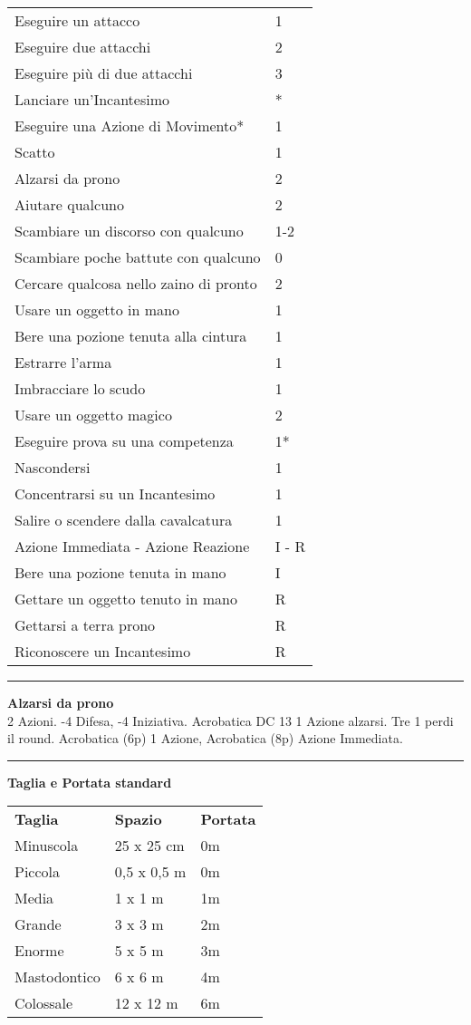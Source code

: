 \documentclass[a4paper,12 pt,openany]{book}
\newcommand{\riga}{\rule{\textwidth}{0.4pt}}
\begin{document}
\begin{textblock*}{8.3cm}
\begin{tabular}{ll}
Eseguire un attacco  					& 1\\
Eseguire due attacchi					& 2\\
Eseguire più di due attacchi			& 3\\
Lanciare un'Incantesimo					& *\\
Eseguire una Azione di Movimento*		& 1\\
Scatto               					& 1\\
Alzarsi da prono						& 2\\
Aiutare qualcuno						& 2\\
Scambiare un discorso con qualcuno		& 1-2\\
Scambiare poche battute con qualcuno	& 0\\
Cercare qualcosa nello zaino di pronto	& 2\\
Usare un oggetto in mano      			& 1\\
Bere una pozione tenuta alla cintura	& 1\\
Estrarre l'arma        					& 1\\
Imbracciare lo scudo					& 1\\
Usare un oggetto magico 				& 2\\
Eseguire prova su una competenza		& 1*\\
Nascondersi								& 1\\
Concentrarsi su un Incantesimo     		& 1\\
Salire o scendere dalla cavalcatura		& 1\\
Azione Immediata - Azione Reazione		& I - R\\
Bere una pozione tenuta in mano			& I\\
Gettare un oggetto tenuto in mano   	& R\\
Gettarsi a terra prono					& R\\
Riconoscere un Incantesimo				& R\\
\end{tabular}

\riga

\textbf{Alzarsi da prono}\\
2 Azioni. -4 Difesa, -4 Iniziativa. Acrobatica DC 13 1 Azione alzarsi. Tre 1 perdi il round. Acrobatica (6p) 1 Azione, Acrobatica (8p) Azione Immediata.

\riga

\textbf{Taglia e Portata standard}\\
\begin{tabular}{lll}
\textbf{Taglia}& \textbf{Spazio} &\textbf{Portata}\\
Minuscola & 25 x 25 cm&0m\\
Piccola & 0,5 x 0,5 m &0m\\
Media & 1 x 1 m & 1m\\
Grande & 3 x 3 m& 2m\\
Enorme & 5 x 5 m &3m\\
Mastodontico & 6 x 6 m&4m\\
Colossale & 12 x 12 m&6m\\
\end{tabular}

\end{textblock*}
\end{document}

